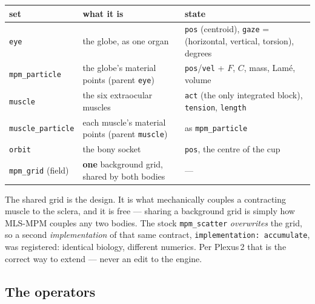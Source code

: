 \documentclass[11pt,a4paper]{article}
\newcommand{\code}[1]{\texttt{#1}}
\begin{document}
\begin{center}\small
\begin{tabular}{@{}llp{7.2cm}@{}}
\toprule
\textbf{set} & \textbf{what it is} & \textbf{state} \\
\midrule
\code{eye} & the globe, as one organ & \code{pos} (centroid), \code{gaze} = (horizontal, vertical, torsion), degrees \\
\code{mpm\_particle} & the globe's material points (parent \code{eye}) & \code{pos}/\code{vel} + $F$, $C$, mass, Lamé, volume \\
\code{muscle} & the six extraocular muscles & \code{act} (the only integrated block), \code{tension}, \code{length} \\
\code{muscle\_particle} & each muscle's material points (parent \code{muscle}) & as \code{mpm\_particle} \\
\code{orbit} & the bony socket & \code{pos}, the centre of the cup \\
\code{mpm\_grid} (field) & \textbf{one} background grid, shared by both bodies & --- \\
\bottomrule
\end{tabular}
\end{center}

The shared grid is the design. It is what mechanically couples a contracting muscle to the sclera,
and it is free --- sharing a background grid is simply how MLS-MPM couples any two bodies. The
stock \code{mpm\_scatter} \emph{overwrites} the grid, so a second \emph{implementation} of that
same contract, \code{implementation: accumulate}, was registered: identical biology, different
numerics. Per Plexus\,2 that is the correct way to extend --- never an edit to the engine.

\subsection{The operators}
\end{document}
